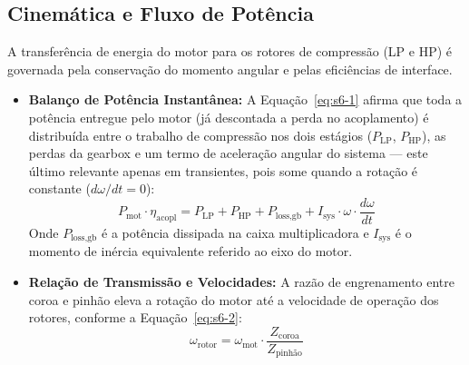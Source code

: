\documentclass[12pt,a4paper]{article}
\numberwithin{equation}{section}
\numberwithin{table}{section}
\numberwithin{figure}{section}
\begin{document}
	\subsection{\textbf{Cinemática e Fluxo de Potência}}
	A transferência de energia do motor para os rotores de compressão (LP e HP) é governada pela conservação do momento angular e pelas eficiências de interface.
	\begin{itemize}
		\item \textbf{Balanço de Potência Instantânea:} A Equação~\eqref{eq:s6-1} afirma que toda a potência entregue pelo motor (já descontada a perda no acoplamento) é distribuída entre o trabalho de compressão nos dois estágios ($P_{\text{LP}}$, $P_{\text{HP}}$), as perdas da gearbox e um termo de aceleração angular do sistema — este último relevante apenas em transientes, pois some quando a rotação é constante ($d\omega/dt = 0$):
		\begin{equation}\label{eq:s6-1}
 P_{\text{mot}} \cdot \eta_{\text{acopl}} = P_{\text{LP}} + P_{\text{HP}} + P_{\text{loss,gb}} + I_{\text{sys}} \cdot \omega \cdot \frac{d\omega}{dt}
\end{equation}
		Onde $P_{\text{loss,gb}}$ é a potência dissipada na caixa multiplicadora e $I_{\text{sys}}$ é o momento de inércia equivalente referido ao eixo do motor.
		\item \textbf{Relação de Transmissão e Velocidades:} A razão de engrenamento entre coroa e pinhão eleva a rotação do motor até a velocidade de operação dos rotores, conforme a Equação~\eqref{eq:s6-2}:
		\begin{equation}\label{eq:s6-2}
 \omega_{\text{rotor}} = \omega_{\text{mot}} \cdot \frac{Z_{\text{coroa}}}{Z_{\text{pinhão}}} 
\end{equation}
	\end{itemize}
	
\end{document}

